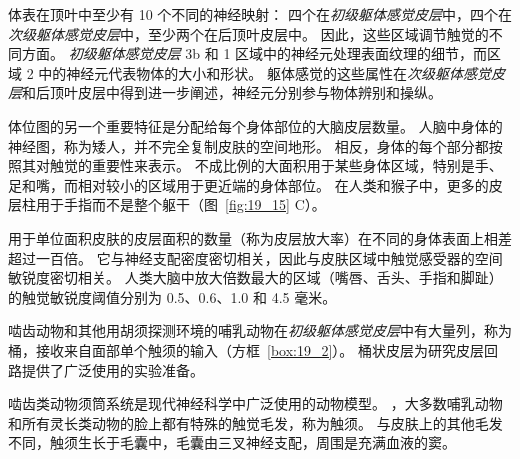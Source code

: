 体表在顶叶中至少有 10 个不同的神经映射：
四个在\textit{初级躯体感觉皮层}中，四个在\textit{次级躯体感觉皮层}中，至少两个在后顶叶皮层中。
因此，这些区域调节触觉的不同方面。
\textit{初级躯体感觉皮层} 3b 和 1 区域中的神经元处理表面纹理的细节，而区域 2 中的神经元代表物体的大小和形状。
躯体感觉的这些属性在\textit{次级躯体感觉皮层}和后顶叶皮层中得到进一步阐述，神经元分别参与物体辨别和操纵。


体位图的另一个重要特征是分配给每个身体部位的大脑皮层数量。
人脑中身体的神经图，称为矮人，并不完全复制皮肤的空间地形。
相反，身体的每个部分都按照其对触觉的重要性来表示。 
不成比例的大面积用于某些身体区域，特别是手、足和嘴，而相对较小的区域用于更近端的身体部位。
在人类和猴子中，更多的皮层柱用于手指而不是整个躯干（图~\ref{fig:19_15} C）。


用于单位面积皮肤的皮层面积的数量（称为皮层放大率）在不同的身体表面上相差超过一百倍。
它与神经支配密度密切相关，因此与皮肤区域中触觉感受器的空间敏锐度密切相关。
人类大脑中放大倍数最大的区域（嘴唇、舌头、手指和脚趾）的触觉敏锐度阈值分别为 0.5、0.6、1.0 和 4.5 毫米。


啮齿动物和其他用胡须探测环境的哺乳动物在\textit{初级躯体感觉皮层}中有大量列，称为桶，接收来自面部单个触须的输入（方框~\ref{box:19_2}）。
桶状皮层为研究皮层回路提供了广泛使用的实验准备。



\begin{proposition}[啮齿动物须桶系统] \label{box:19_2}
	
	\quad \quad 啮齿类动物须筒系统是现代神经科学中广泛使用的动物模型。
	，大多数哺乳动物和所有灵长类动物的脸上都有特殊的触觉毛发，称为触须。
	与皮肤上的其他毛发不同，触须生长于毛囊中，毛囊由三叉神经支配，周围是充满血液的窦。
	
\end{proposition}


